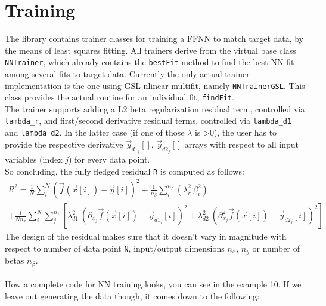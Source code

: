 \documentclass[11pt,a4paper,twoside]{article}
\begin{document}

\section{Training} %
\label{sec:training}

The library contains trainer classes for training a FFNN to match target data,
by the means of least squares fitting. All trainers derive from the virtual base class
\verb+NNTrainer+, which already contains the \verb+bestFit+ method to find the
best NN fit among several fits to target data.
Currently the only actual trainer implementation is the one using GSL nlinear
multifit, namely \verb+NNTrainerGSL+. This class provides the actual routine for
an individual fit, \verb+findFit+.
\\The trainer supports adding a L2 beta regularization residual term, controlled via
\verb+lambda_r+, and first/second derivative residual terms, controlled via
\verb+lambda_d1+ and \verb+lambda_d2+. In the latter case (if one of those
$\lambda$ is >0), the user has to
provide the respective derivative $\vec{y}_{d1_j}[]$, $\vec{y}_{d2_j}[]$ arrays with respect to all
input variables (index $j$) for every data point.
\\So concluding, the fully fledged residual \verb+R+ is computed as follows:
\begin{multline*}
  R^2 = \frac{1}{N} \sum_i^N  \left(\vec{f}(\vec{x}[i]) - \vec{y}[i]\right)^2 + \frac{1}{n_{\beta}} \sum_i^{n_{\beta}} \left( \lambda_r^2\ \beta_i^2 \right) \\
    + \frac{1}{N n_x} \sum_i^N \sum_j^{n_x} \left[ \lambda_{d1}^2\ (\partial_{x_j} \vec{f}(\vec{x}[i]) - \vec{y}_{d1_j}[i])^2  + \lambda_{d2}^2\ (\partial_{x_j}^2 \vec{f}(\vec{x}[i]) - \vec{y}_{d2_j}[i])^2 \right]
\end{multline*}
The design of the residual makes sure that it doesn't vary in magnitude with
respect to number of data point \verb+N+, input/output dimensions $n_x$,
$n_y$ or number of betas $n_{\beta}$.
\\\\How a complete code for NN training looks, you can see in the example 10.
If we leave out generating the data though, it comes down to the following:
\end{document}
